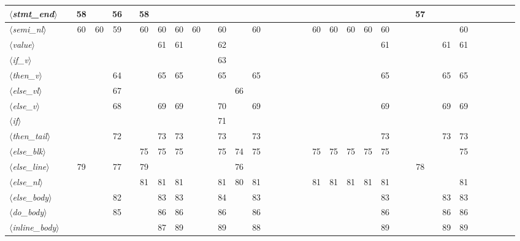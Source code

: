 \documentclass[a4paper,11pt]{article}
\newcommand{\nt}[1]{$\langle$\textit{#1}$\rangle$}   %
\begin{document}
\begin{landscape}
\begin{table}[p]
{\begin{tabular}{|l|c|c|c|c|c|c|c|c|c|c|c|c|c|c|c|c|c|c|c|c|c|c|c|c|c|c|c|c|c|c|c|c|c|c|}
\nt{stmt\_end} &  & 58 &  & 56 &  & 58 &  &  &  &  &  &  &  &  &  &  &  &  &  &  &  &  &  &  &  & 57 &  &  &  &  &  &  &  &  \\ \hline
\nt{semi\_nl} &  & 60 & 60 & 59 &  & 60 & 60 & 60 & 60 &  & 60 &  & 60 &  &  &  &  &  & 60 & 60 & 60 & 60 & 60 &  &  &  &  &  & 60 &  &  &  &  &  \\ \hline
\nt{value} &  &  &  &  &  &  & 61 & 61 &  &  & 62 &  &  &  &  &  &  &  &  &  &  &  & 61 &  &  &  &  & 61 & 61 &  &  &  &  &  \\ \hline
\nt{if\_v} &  &  &  &  &  &  &  &  &  &  & 63 &  &  &  &  &  &  &  &  &  &  &  &  &  &  &  &  &  &  &  &  &  &  &  \\ \hline
\nt{then\_v} &  &  &  & 64 &  &  & 65 & 65 &  &  & 65 &  & 65 &  &  &  &  &  &  &  &  &  & 65 &  &  &  &  & 65 & 65 &  &  &  &  &  \\ \hline
\nt{else\_vl} &  &  &  & 67 &  &  &  &  &  &  &  & 66 &  &  &  &  &  &  &  &  &  &  &  &  &  &  &  &  &  &  &  &  &  &  \\ \hline
\nt{else\_v} &  &  &  & 68 &  &  & 69 & 69 &  &  & 70 &  & 69 &  &  &  &  &  &  &  &  &  & 69 &  &  &  &  & 69 & 69 &  &  &  &  &  \\ \hline
\nt{if} &  &  &  &  &  &  &  &  &  &  & 71 &  &  &  &  &  &  &  &  &  &  &  &  &  &  &  &  &  &  &  &  &  &  &  \\ \hline
\nt{then\_tail} &  &  &  & 72 &  &  & 73 & 73 &  &  & 73 &  & 73 &  &  &  &  &  &  &  &  &  & 73 &  &  &  &  & 73 & 73 &  &  &  &  &  \\ \hline
\nt{else\_blk} &  &  &  &  &  & 75 & 75 & 75 &  &  & 75 & 74 & 75 &  &  &  &  &  & 75 & 75 & 75 & 75 & 75 &  &  &  &  &  & 75 &  &  &  &  &  \\ \hline
\nt{else\_line} &  & 79 &  & 77 &  & 79 &  &  &  &  &  & 76 &  &  &  &  &  &  &  &  &  &  &  &  &  & 78 &  &  &  &  &  &  &  &  \\ \hline
\nt{else\_nl} &  &  &  &  &  & 81 & 81 & 81 &  &  & 81 & 80 & 81 &  &  &  &  &  & 81 & 81 & 81 & 81 & 81 &  &  &  &  &  & 81 &  &  &  &  &  \\ \hline
\nt{else\_body} &  &  &  & 82 &  &  & 83 & 83 &  &  & 84 &  & 83 &  &  &  &  &  &  &  &  &  & 83 &  &  &  &  & 83 & 83 &  &  &  &  &  \\ \hline
\nt{do\_body} &  &  &  & 85 &  &  & 86 & 86 &  &  & 86 &  & 86 &  &  &  &  &  &  &  &  &  & 86 &  &  &  &  & 86 & 86 &  &  &  &  &  \\ \hline
\nt{inline\_body} &  &  &  &  &  &  & 87 & 89 &  &  & 89 &  & 88 &  &  &  &  &  &  &  &  &  & 89 &  &  &  &  & 89 & 89 &  &  &  &  &  \\ \hline

\end{tabular}}
\end{table}
\end{landscape}
\end{document}
